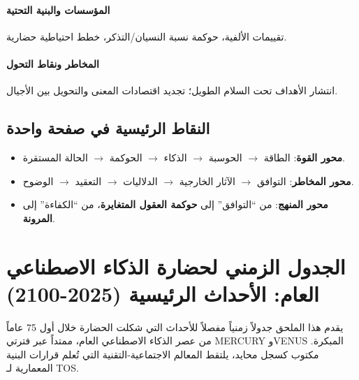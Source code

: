 \documentclass[11pt]{article}
\begin{document}
\paragraph{المؤسسات والبنية التحتية} تقييمات الألفية، حوكمة نسبة النسيان/التذكر، خطط احتياطية حضارية.

\paragraph{المخاطر ونقاط التحول} انتشار الأهداف تحت السلام الطويل؛ تجديد اقتصادات المعنى والتحويل بين الأجيال.

\subsection{النقاط الرئيسية في صفحة واحدة}
\begin{itemize}[noitemsep]
  \item \textbf{محور القوة}: الطاقة $\rightarrow$ الحوسبة $\rightarrow$ الذكاء $\rightarrow$ الحوكمة $\rightarrow$ الحالة المستقرة.
  \item \textbf{محور المخاطر}: التوافق $\rightarrow$ الآثار الخارجية $\rightarrow$ الدلاليات $\rightarrow$ التعقيد $\rightarrow$ الوضوح.
  \item \textbf{محور المنهج}: من ``التوافق'' إلى \textbf{حوكمة العقول المتغايرة}، من ``الكفاءة'' إلى \textbf{المرونة}.
\end{itemize}

\newpage

\section{الجدول الزمني لحضارة الذكاء الاصطناعي العام: الأحداث الرئيسية (2025-2100)}
\label{appendix:timeline}

يقدم هذا الملحق جدولاً زمنياً مفصلاً للأحداث التي شكلت الحضارة خلال أول 75 عاماً من عصر الذكاء الاصطناعي العام، ممتداً عبر فترتي MERCURY وVENUS المبكرة. مكتوب كسجل محايد، يلتقط المعالم الاجتماعية-التقنية التي تُعلم قرارات البنية المعمارية لـ TOS.
\end{document}
